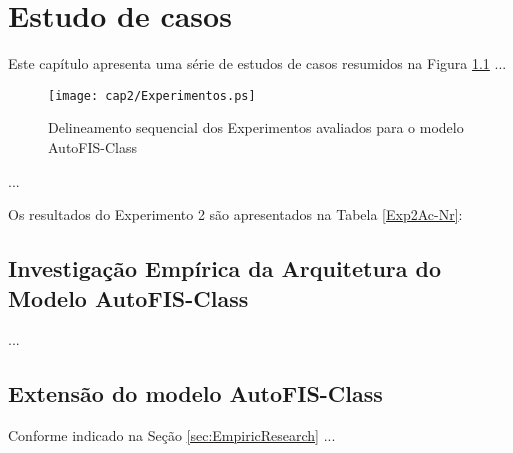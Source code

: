 
\chapter{Estudo de casos}

Este capítulo apresenta uma série de estudos de casos resumidos na Figura \ref{fig:2-3} ...

\begin{figure} [h]
	\begin{center}
		\texttt{[image: cap2/Experimentos.ps]}
		\caption{Delineamento sequencial dos Experimentos avaliados para o modelo AutoFIS-Class}\label{fig:2-3}
	\end{center}
\end{figure}

...

Os resultados do Experimento 2 são apresentados na Tabela \ref{Exp2Ac-Nr}:



\newpage

\section{Investigação
	Empírica da Arquitetura do Modelo AutoFIS-Class \label{sec:EmpiricResearch}}

...

\section{Extensão do modelo AutoFIS-Class}
	
Conforme indicado na Seção \ref{sec:EmpiricResearch} ...
